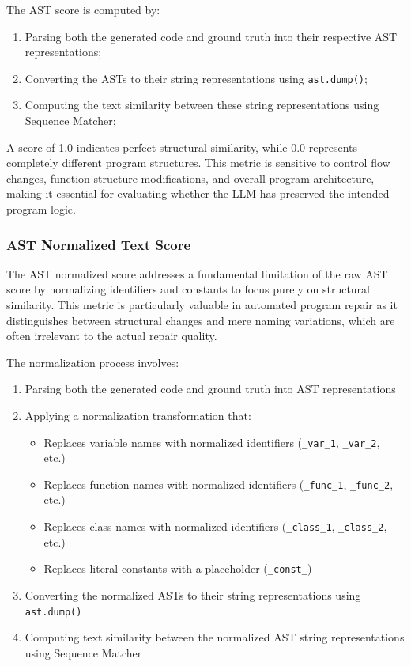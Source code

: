 The AST score is computed by:
\begin{enumerate}
    \item Parsing both the generated code and ground truth into their respective AST representations;
    \item Converting the ASTs to their string representations using \texttt{ast.dump()};
    \item Computing the text similarity between these string representations using Sequence Matcher;
\end{enumerate}

A score of 1.0 indicates perfect structural similarity, while 0.0 represents completely different program structures. This metric is sensitive to control flow changes, function structure modifications, and overall program architecture, making it essential for evaluating whether the LLM has preserved the intended program logic.

\subsubsection{AST Normalized Text Score}
The AST normalized score addresses a fundamental limitation of the raw AST score by normalizing identifiers and constants to focus purely on structural similarity. This metric is particularly valuable in automated program repair as it distinguishes between structural changes and mere naming variations, which are often irrelevant to the actual repair quality.

The normalization process involves:
\begin{enumerate}
    \item Parsing both the generated code and ground truth into AST representations
    \item Applying a normalization transformation that:
        \begin{itemize}
            \item Replaces variable names with normalized identifiers (\texttt{\_var\_1}, \texttt{\_var\_2}, etc.)
            \item Replaces function names with normalized identifiers (\texttt{\_func\_1}, \texttt{\_func\_2}, etc.)
            \item Replaces class names with normalized identifiers (\texttt{\_class\_1}, \texttt{\_class\_2}, etc.)
            \item Replaces literal constants with a placeholder (\texttt{\_const\_})
        \end{itemize}
    \item Converting the normalized ASTs to their string representations using \texttt{ast.dump()}
    \item Computing text similarity between the normalized AST string representations using Sequence Matcher
\end{enumerate}

